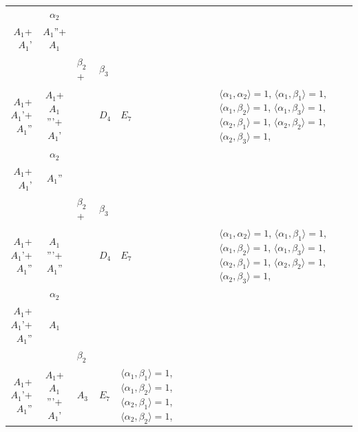 \documentclass[12pt]{report}
\begin{document}
\begin{appendix}
{\begin{longtable}{rcl p{1cm}p{1cm}p{3cm} }
\begin{tabular}{cc}$\alpha_1$+ & $\alpha_2$\\\tiny{ $A_1$+$A_1$' } & \tiny{ $A_1$''+$A_1$ }\end{tabular} &\begin{tabular}{c} = \\~ \end{tabular} & \begin{tabular}{ccc}$\beta_1$+ & $\beta_2$+ & $\beta_3$\\\tiny{ $A_1$+$A_1$'+$A_1$'' } & \tiny{ $A_1$+$A_1$'''+$A_1$' } & \tiny{  }\end{tabular} & $D_4$ & $E_7$ & $\langle\alpha_1, \alpha_2\rangle=1$,  $\langle\alpha_1, \beta_1\rangle=1$, $\langle\alpha_1, \beta_2\rangle=1$, $\langle\alpha_1, \beta_3\rangle=1$, $\langle\alpha_2, \beta_1\rangle=1$, $\langle\alpha_2, \beta_2\rangle=1$, $\langle\alpha_2, \beta_3\rangle=1$, 
\\
\begin{tabular}{cc}$\alpha_1$+ & $\alpha_2$\\\tiny{ $A_1$+$A_1$' } & \tiny{ $A_1$'' }\end{tabular} &\begin{tabular}{c} = \\~ \end{tabular} & \begin{tabular}{ccc}$\beta_1$+ & $\beta_2$+ & $\beta_3$\\\tiny{ $A_1$+$A_1$'+$A_1$'' } & \tiny{ $A_1$'''+$A_1$'' } & \tiny{  }\end{tabular} & $D_4$ & $E_7$ & $\langle\alpha_1, \alpha_2\rangle=1$,  $\langle\alpha_1, \beta_1\rangle=1$, $\langle\alpha_1, \beta_2\rangle=1$, $\langle\alpha_1, \beta_3\rangle=1$, $\langle\alpha_2, \beta_1\rangle=1$, $\langle\alpha_2, \beta_2\rangle=1$, $\langle\alpha_2, \beta_3\rangle=1$, 
\\
\begin{tabular}{cc}$\alpha_1$+ & $\alpha_2$\\\tiny{ $A_1$+$A_1$'+$A_1$'' } & \tiny{ $A_1$ }\end{tabular} &\begin{tabular}{c} = \\~ \end{tabular} & \begin{tabular}{cc}$\beta_1$+ & $\beta_2$\\\tiny{ $A_1$+$A_1$'+$A_1$'' } & \tiny{ $A_1$+$A_1$'''+$A_1$' }\end{tabular} & $A_3$ & $E_7$ &  $\langle\alpha_1, \beta_1\rangle=1$, $\langle\alpha_1, \beta_2\rangle=1$, $\langle\alpha_2, \beta_1\rangle=1$, $\langle\alpha_2, \beta_2\rangle=1$, 

\end{longtable}}
\end{appendix}
\end{document}
